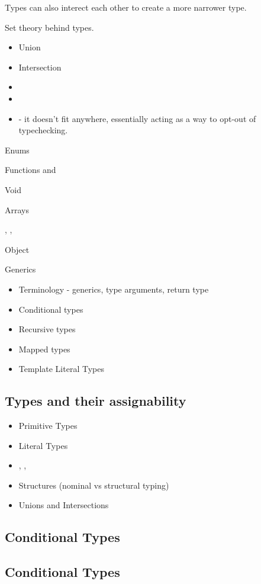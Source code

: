 Types can also interect each other to create a more narrower type.


Set theory behind types.

\begin{itemize}
  \item Union
  \item Intersection
  \item {}
  \item {}
  \item {} - it doesn't fit anywhere, essentially acting as a way to opt-out of typechecking.
\end{itemize}

Enums

Functions and 

Void

Arrays

, , 

Object

Generics

\begin{itemize}
  \item Terminology - generics, type arguments, return type
  \item Conditional types
  \item Recursive types
  \item Mapped types
  \item Template Literal Types
\end{itemize}

\subsection{Types and their assignability}

\begin{itemize}
  \item Primitive Types
  \item Literal Types
  \item {}, , 
  \item Structures (nominal vs structural typing)
  \item Unions and Intersections
\end{itemize}

\subsection{Conditional Types}
\subsection{Conditional Types}
